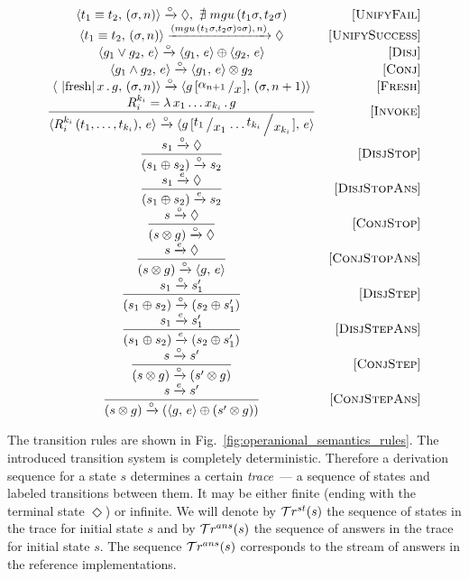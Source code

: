 \begin{figure*}[h]
  \renewcommand{\arraystretch}{1.6}
  \[
  \begin{array}{cr}
    \taskst{t_1 \equiv t_2}{(\sigma, n)} \xrightarrow{\circ} \Diamond , \, \, \nexists\; mgu\,(t_1 \sigma, t_2 \sigma) &\ruleno{UnifyFail} \\
    \taskst{t_1 \equiv t_2}{(\sigma, n)} \xrightarrow{(mgu\,(t_1 \sigma, t_2 \sigma) \circ \sigma),\, n)} \Diamond & \ruleno{UnifySuccess} \\
    \taskst{g_1 \lor g_2}{e} \xrightarrow{\circ} \taskst{g_1}{e} \oplus \taskst{g_2}{e} & \ruleno{Disj} \\
    \taskst{g_1 \land g_2}{e} \xrightarrow{\circ} \taskst{g_1}{e} \otimes g_2 & \ruleno{Conj} \\
    \taskst{\mbox{\lstinline|fresh|}\, x\, .\, g}{(\sigma, n)} \xrightarrow{\circ} \taskst{g\,[\bigslant{\alpha_{n + 1}}{x}]}{( \sigma, n + 1)} & \ruleno{Fresh} \\
    \dfrac{R_i^{k_i}=\lambda\,x_1\dots x_{k_i}\,.\,g}{\taskst{R_i^{k_i}\,(t_1,\dots,t_{k_i})}{e} \xrightarrow{\circ} \taskst{g\,[\bigslant{t_1}{x_1}\dots\bigslant{t_{k_i}}{x_{k_i}}]}{e}} & \ruleno{Invoke}\\
    \dfrac{s_1 \xrightarrow{\circ} \Diamond}{(s_1 \oplus s_2) \xrightarrow{\circ} s_2} & \ruleno{DisjStop}\\
    \dfrac{s_1 \xrightarrow{e} \Diamond}{(s_1 \oplus s_2) \xrightarrow{e} s_2} & \ruleno{DisjStopAns}\\
    \dfrac{s \xrightarrow{\circ} \Diamond}{(s \otimes g) \xrightarrow{\circ} \Diamond} &\ruleno{ConjStop}\\
    \dfrac{s \xrightarrow{e} \Diamond}{(s \otimes g) \xrightarrow{\circ} \taskst{g}{e}}  & \ruleno{ConjStopAns}\\
    \dfrac{s_1 \xrightarrow{\circ} s'_1}{(s_1 \oplus s_2) \xrightarrow{\circ} (s_2 \oplus s'_1)} &\ruleno{DisjStep}\\
    \dfrac{s_1 \xrightarrow{e} s'_1}{(s_1 \oplus s_2) \xrightarrow{e} (s_2 \oplus s'_1)} &\ruleno{DisjStepAns}\\
    \dfrac{s \xrightarrow{\circ} s'}{(s \otimes g) \xrightarrow{\circ} (s' \otimes g)} &\ruleno{ConjStep}\\
    \dfrac{s \xrightarrow{e} s'}{(s \otimes g) \xrightarrow{\circ} (\taskst{g}{e} \oplus (s' \otimes g))} & \ruleno{ConjStepAns} 
  \end{array}
  \]
  \caption{Operational semantics of interleaving search}
  \label{fig:operanional_semantics_rules}
\end{figure*}

The transition rules are shown in Fig.~\ref{fig:operanional_semantics_rules}.
The introduced transition system is completely deterministic.
Therefore a derivation sequence for a state $s$ determines a certain \emph{trace}~--- a sequence of states and labeled transitions between
them.
It may be either finite (ending with the terminal state $\Diamond$) or infinite.
We will denote by $\mathcal{T}r^{st}(s)$ the sequence of states in the trace for initial state $s$ and by $\mathcal{T}r^{ans}(s)$ the sequence of answers
in the trace for initial state $s$. The sequence $\mathcal{T}r^{ans}(s)$ corresponds to the stream of answers in the reference \mK implementations.
